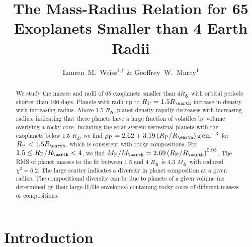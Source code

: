 \documentclass[iop]{emulateapj}
\newcommand{\gcmc}{\ensuremath{\rm g\,cm^{-3}}}
\newcommand{\gcc}{\gcmc}
\newcommand{\rpl}{\ensuremath{R_{\rm P}}}
\newcommand{\mpl}{\ensuremath{M_{\rm P}}}
\newcommand{\rhopl}{\ensuremath{\rho_{\rm P}}}
\newcommand{\rearth}{\ensuremath{R_\earth}}
\newcommand{\mearth}{\ensuremath{M_\earth}}
\begin{document}
\title{The Mass-Radius Relation for 65 Exoplanets Smaller than 4 Earth Radii}
\author{Lauren~M.~Weiss$^{1,\dagger}$ \& Geoffrey~W.~Marcy$^1$}


\begin{abstract}
We study the masses and radii of 65 exoplanets smaller than 4\rearth\ with orbital periods shorter than 100 days.  Planets with radii up to $\rpl=1.5\rearth$ increase in density with increasing radius.   Above 1.5 \rearth, planet density rapidly decreases with increasing radius, indicating that these planets have a large fraction of volatiles by volume overlying a rocky core.  Including the solar system terrestrial planets with the exoplanets below 1.5 \rearth, we find $\rhopl = 2.62 + 3.19 \left(\rpl/\rearth\right) \gcc$ for $\rpl < 1.5 \rearth$, which is consistent with rocky compositions.  For $1.5 \le \rpl/\rearth < 4$, we find $\mpl/\mearth = 2.69 \left(\rpl/\rearth\right)^{0.93}$.  The RMS of planet masses to the fit between 1.5 and 4 \rearth\ is 4.3 \mearth\ with reduced $\chi^2=6.2$.  The large scatter indicates a diversity in planet composition at a given radius.  The compositional diversity can be due to planets of a given volume (as determined by their large H/He envelopes) containing rocky cores of different masses or compositions.
\end{abstract}


\section{Introduction}
\end{document}
